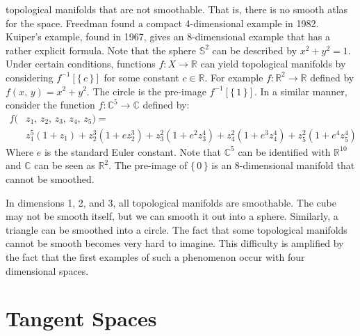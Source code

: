 \documentclass{article}
\theoremstyle{plain}
\theoremstyle{normal}
\begin{document}
        topological manifolds that are not smoothable. That is, there is no
        smooth atlas for the space. Freedman found a compact 4-dimensional
        example in 1982. Kuiper's example, found in 1967, gives an 8-dimensional
        example that has a rather explicit formula. Note that the sphere
        $\mathbb{S}^{2}$ can be described by $x^{2}+y^{2}=1$. Under certain
        conditions, functions $f:X\rightarrow\mathbb{R}$ can yield topological
        manifolds by considering $f^{-1}[\{\,c\,\}]$ for some constant
        $c\in\mathbb{R}$. For example $f:\mathbb{R}^{2}\rightarrow\mathbb{R}$
        defined by $f(x,\,y)=x^{2}+y^{2}$. The circle is the pre-image
        $f^{-1}[\{\,1\,\}]$. In a similar manner, consider the function
        $f:\mathbb{C}^{5}\rightarrow\mathbb{C}$ defined by:
        \begin{align}
            \nonumber
            f(&z_{1},\,z_{2},\,z_{3},\,z_{4},\,z_{5})
                =\\
                &z_{1}^{5}(1+z_{1})
                +z_{2}^{3}(1+ez_{2}^{3})
                +z_{3}^{2}(1+e^{2}z_{3}^{4})
                +z_{4}^{2}(1+e^{3}z_{4}^{4})
                +z_{5}^{2}(1+e^{4}z_{5}^{4})
        \end{align}
        Where $e$ is the standard Euler constant.
        Note that $\mathbb{C}^{5}$ can be identified with $\mathbb{R}^{10}$
        and $\mathbb{C}$ can be seen as $\mathbb{R}^{2}$. The pre-image of
        $\{\,0\,\}$ is an 8-dimensional manifold that cannot be smoothed.
        \par\hfill\par
        In dimensions 1, 2, and 3, all topological manifolds are smoothable.
        The cube may not be smooth itself, but we can smooth it out into a
        sphere. Similarly, a triangle can be smoothed into a circle. The fact
        that some topological manifolds cannot be smooth becomes very hard to
        imagine. This difficulty is amplified by the fact that the first
        examples of such a phenomenon occur with four dimensional spaces.
    \section{Tangent Spaces}
\end{document}
